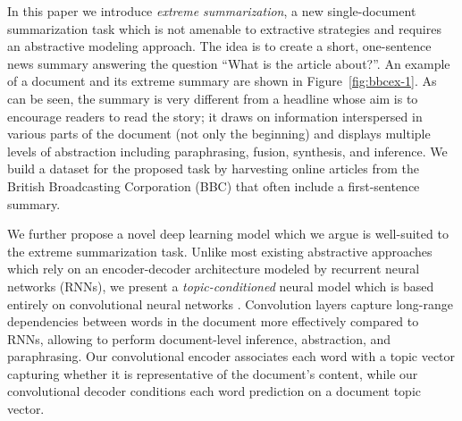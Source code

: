 In this paper we introduce \emph{extreme summarization}, a new
single-document summarization task which is not amenable to extractive
strategies and requires an abstractive modeling approach. The idea is
to create a short, one-sentence news summary answering the question
``What is the article about?''. An example of a document and its
extreme summary are shown in Figure~\ref{fig:bbcex-1}. As can be seen,
the summary is very different from a headline whose aim is to
encourage readers to read the story; it draws on information
interspersed in various parts of the document (not only the beginning)
and displays multiple levels of abstraction including paraphrasing,
fusion, synthesis, and inference. We build a dataset for the proposed
task by harvesting online articles from the British Broadcasting
Corporation (BBC) that often include a first-sentence summary.








We further propose a novel deep learning model which we argue is
well-suited to the extreme summarization task. Unlike most existing
abstractive approaches
\cite{rush-acl15,chenIjcai-16,nallapati-signll16,see-acl17,tanwan-acl17,paulus-socher-arxiv17,Pasunuru-multireward18,asli-multiagent18}
which rely on an encoder-decoder architecture modeled by recurrent
neural networks (RNNs), we present a \emph{topic-conditioned} neural
model which is based entirely on convolutional neural networks
\cite{convseq2seq}. Convolution layers capture long-range
dependencies between words in the document more effectively compared to
RNNs, allowing to perform document-level inference, abstraction, and
paraphrasing.  Our convolutional encoder associates each word with a
topic vector capturing whether it is representative of the document's
content, while our convolutional decoder conditions each word
prediction on a document topic vector.


